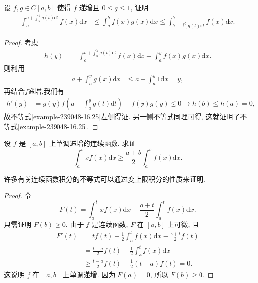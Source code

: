 \documentclass[../../main.tex]{subfiles}%
\begin{document}
\begin{example}
设 $f,g \in C[a,b]$ 使得 $f$ 递增且 $0 \leqslant g \leqslant 1$, 证明
\begin{align}\label{example-239048-16.25}
\int_{a}^{a + \int_{a}^{b}g(t)\mathrm{d}t}f(x)\mathrm{d}x &\leqslant \int_{a}^{b}f(x)g(x)\mathrm{d}x \leqslant \int_{b - \int_{a}^{b}g(t)\mathrm{d}t}^{b}f(x)\mathrm{d}x.
\end{align}
\end{example}
\begin{proof}

考虑
\begin{align*}
h(y) &= \int_{a}^{a + \int_{a}^{y}g(t)\mathrm{d}t}f(x)\mathrm{d}x - \int_{a}^{y}f(x)g(x)\mathrm{d}x.
\end{align*}
则利用
\begin{align*}
a + \int_{a}^{y}g(x)\mathrm{d}x &\leqslant a + \int_{a}^{y}1\mathrm{d}x = y,
\end{align*}
再结合$f$递增,我们有
\begin{align*}
h'(y) &= g(y)f\left(a + \int_{a}^{y}g(t)\mathrm{d}t\right) - f(y)g(y) \leqslant 0 \to h(b) \leqslant h(a) = 0,
\end{align*}
故不等式\eqref{example-239048-16.25}左侧得证. 另一侧不等式同理可得, 这就证明了不等式\eqref{example-239048-16.25}. 

\end{proof}

\begin{proposition}
设 $f$ 是 $[a,b]$ 上单调递增的连续函数. 求证
$$\int_a^b xf(x)\mathrm{d}x\geqslant \frac{a+b}{2}\int_a^b f(x)\mathrm{d}x.$$
\end{proposition}
\begin{note}
许多有关连续函数积分的不等式可以通过变上限积分的性质来证明.
\end{note}
\begin{proof}

令
$$F(t)=\int_a^t xf(x)\mathrm{d}x-\frac{a+t}{2}\int_a^t f(x)\mathrm{d}x.$$
只需证明 $F(b)\geqslant 0$. 由于 $f$ 是连续函数, $F$ 在 $[a,b]$ 上可微, 且
$$
\begin{aligned}
F'(t) &= tf(t)-\frac{1}{2}\int_a^t f(x)\mathrm{d}x-\frac{a+t}{2}f(t) \\
&= \frac{t-a}{2}f(t)-\frac{1}{2}\int_a^t f(x)\mathrm{d}x \\
&\geqslant  \frac{t-a}{2}f(t)-\frac{1}{2}(t-a)f(t)=0.
\end{aligned}
$$
这说明 $f$ 在 $[a,b]$ 上单调递增. 因为 $F(a)=0$, 所以 $F(b)\geqslant 0$.

\end{proof}
\end{document}
